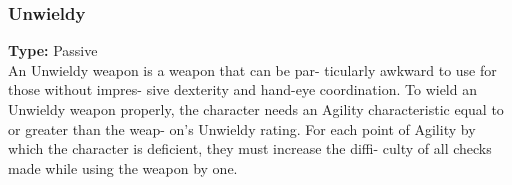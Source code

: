 \subsubsection{Unwieldy}
\label{iqty:unwieldy}
\textbf{Type:} Passive\\
An Unwieldy weapon is a weapon that can be par-
ticularly awkward to use for those without impres-
sive dexterity and hand-eye coordination. To wield
an Unwieldy weapon properly, the character needs an
Agility characteristic equal to or greater than the weap-
on’s Unwieldy rating. For each point of Agility by which
the character is deficient, they must increase the diffi-
culty of all checks made while using the weapon by one.
